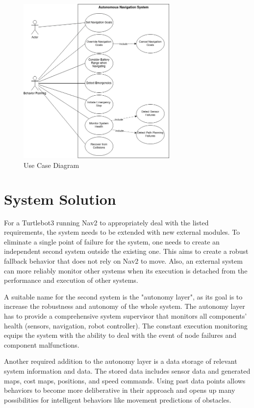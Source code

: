 \begin{figure}[ht]
	\centering
	\includegraphics[width=0.7\textwidth]{images/use_case.png}
	\caption{Use Case Diagram}
	\label{fig:use_case}
\end{figure}


\section{System Solution}
\label{sec:System Solution}

For a Turtlebot3 running Nav2 to appropriately deal with the listed requirements, the system needs to be extended with new external modules. To eliminate a single point of failure for the system, one needs to create an independent second system outside the existing one. This aims to create a robust fallback behavior that does not rely on Nav2 to move. Also, an external system can more reliably monitor other systems when its execution is detached from the performance and execution of other systems.

A suitable name for the second system is the "autonomy layer", as its goal is to increase the robustness and autonomy of the whole system. The autonomy layer has to provide a comprehensive system supervisor that monitors all components' health (sensors, navigation, robot controller). The constant execution monitoring equips the system with the ability to deal with the event of node failures and component malfunctions.

Another required addition to the autonomy layer is a data storage of relevant system information and data. The stored data includes sensor data and generated maps, cost maps, positions, and speed commands. Using past data points allows behaviors to become more deliberative in their approach and opens up many possibilities for intelligent behaviors like movement predictions of obstacles. 

